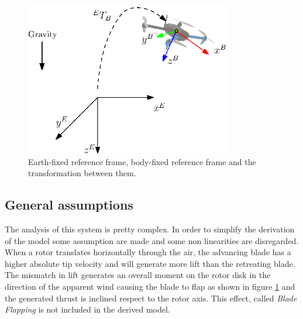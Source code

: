\begin{figure}[h]
\centering
 \includegraphics[width=0.8\textwidth]{ref_frames.eps}
 \caption[Reference frames for modeling]{Earth-fixed reference frame,  body-fixed reference frame and the transformation between them.}
 \label{figure:refframes}
\end{figure}

\subsection{General assumptions}

The analysis of this system is pretty complex. In order to simplify the derivation of the model some assumption are made and some non linearities are disregarded. \\ 

\noindent
When a rotor translates horizontally through the air, the advancing blade has a higher absolute tip velocity and will generate more lift than the retreating blade. The mismatch in lift generates an overall moment on the rotor disk in the direction of the apparent wind causing the blade to flap as shown in figure \ref{figure:refframes} and the generated thrust is inclined respect to the rotor axis. This effect, called \textit{Blade Flapping} is not included in the derived model.

